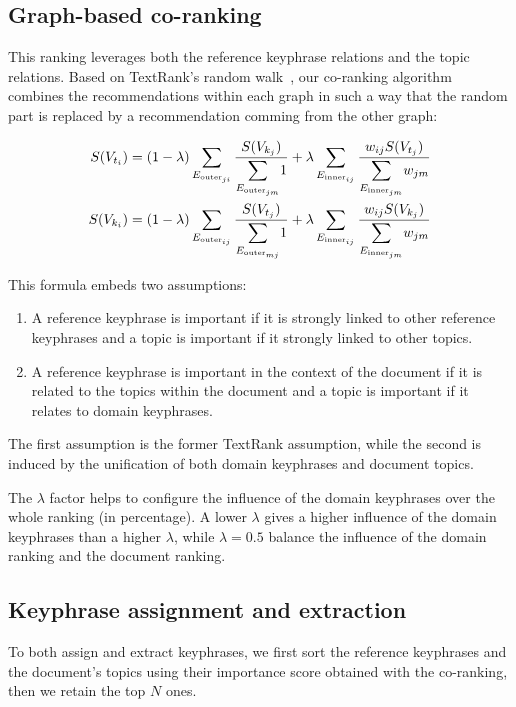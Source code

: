   \subsection{Graph-based co-ranking}
  \label{subsec:graph_based_co_ranking}
    This ranking leverages both the reference keyphrase relations and the topic
    relations. Based on TextRank's random walk~\cite{mihalcea2004textrank}, our
    co-ranking algorithm combines the recommendations within each graph in such
    a way that the random part is replaced by a recommendation comming from the
    other graph:
    \begin{tiny}
      \begin{align}
        S(V_{t_i}) &= (1 - \lambda) \sum_{E_{\text{outer}_{ji}}}{\frac{S(V_{k_j})}{\mathlarger\sum_{E_{\text{outer}_{jm}}}{1}}} + \lambda \sum_{E_{\text{inner}_{ij}}}{\frac{w_{ij} S(V_{t_j})}{\mathlarger\sum_{E_{\text{inner}_{jm}}}{{w_{jm}}}}}\\
        S(V_{k_i}) &= (1 - \lambda) \sum_{E_{\text{outer}_{ij}}}{\frac{S(V_{t_j})}{\mathlarger\sum_{E_{\text{outer}_{mj}}}{1}}} + \lambda \sum_{E_{\text{inner}_{ij}}}{\frac{w_{ij} S(V_{k_j})}{\mathlarger\sum_{E_{\text{inner}_{jm}}}{{w_{jm}}}}}
      \end{align}
    \end{tiny}
    This formula embeds two assumptions:
    \begin{enumerate}
      \item{A reference keyphrase is important if it is strongly linked to other
            reference keyphrases and a topic is important if it strongly linked
            to other topics.}
      \item{A reference keyphrase is important in the context of the document if
            it is related to the topics within the document and a topic is
            important if it relates to domain keyphrases.}
    \end{enumerate}
    The first assumption is the former TextRank assumption, while the second is
    induced by the unification of both domain keyphrases and document topics.

    The $\lambda$ factor helps to configure the influence of the domain
    keyphrases over the whole ranking (in percentage). A lower $\lambda$ gives a
    higher influence of the domain keyphrases than a higher $\lambda$, while
    $\lambda=0.5$ balance the influence of the domain ranking and the document
    ranking.

  \subsection{Keyphrase assignment and extraction}
  \label{subsec:keyphrase_assignment_and_extraction}
    To both assign and extract keyphrases, we first sort the reference
    keyphrases and the document's topics using their importance score obtained
    with the co-ranking, then we retain the top $N$ ones.

